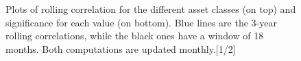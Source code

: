 \begin{figure}
	\centering
	\noindent{}
   \noindent{}

\caption[Plots of rolling correlations]{Plots of rolling correlation for the different asset classes (on top) and significance for each value (on bottom). Blue lines are the 3-year rolling correlations, while the black ones have a window of 18 months. Both computations are updated monthly.[1/2]}
\label{roll_corr1}
\end{figure}

